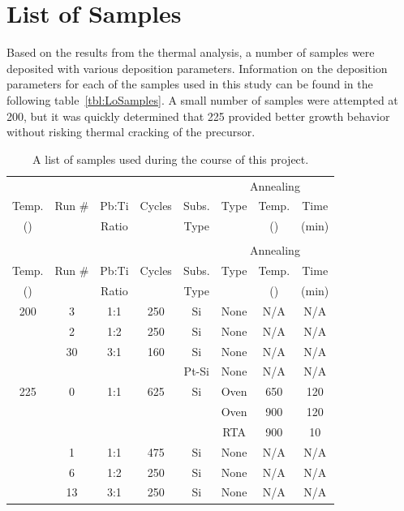 \section{List of Samples}
\label{chap:Results-Samples}

Based on the results from the thermal analysis, a number of samples were deposited with various deposition parameters. Information on the deposition parameters for each of the samples used in this study can be found in the following table~\vref{tbl:LoSamples}. A small number of samples were attempted at 200\degC{}, but it was quickly determined that 225\degC{} provided better growth behavior without risking thermal cracking of the precursor. 

{\small
\vspace{2em}
\begin{longtable}{cccccccc}
	\caption[List of Samples]{A list of samples produced during the course of this project.%
	\label{tbl:LoSamples}}\\
	\toprule
	&&&&&\multicolumn{3}{c}{Annealing}\\ \cmidrule{6-8}
	Temp.		&Run \#	&Pb:Ti	 	&Cycles 	&Subs. 	&Type	&Temp. 		&Time\\ 
	(\degC{})		&		&Ratio		&		&Type	&		&(\degC{})	&(min)\\ \midrule%
	\endfirsthead
	\caption[]{A list of samples used during the course of this project.}\\
	\toprule
	&&&&&\multicolumn{3}{c}{Annealing}\\ \cmidrule{6-8}
	Temp.		&Run \#	&Pb:Ti	 	&Cycles 	&Subs. 	&Type	&Temp. 		&Time \\ 
	(\degC{})		&		&Ratio		&		&Type	&		&(\degC{})	&(min) \\ \midrule%
	\endhead
	200	&3		&1:1		&250	&Si		&None	&N/A		&N/A		\\
		&2		&1:2		&250	&Si		&None	&N/A		&N/A		\\
		&30		&3:1		&160	&Si		&None	&N/A		&N/A		\\
		&		&		&		&Pt-Si	&None	&N/A		&N/A		\\ \midrule
	225	&0		&1:1		&625	&Si		&Oven	&650	&120	\\
		&		&		&		&		&Oven	&900	&120	\\
		&		&		&		&		&RTA	&900	&10		\\
		&1		&1:1		&475	&Si		&None	&N/A		&N/A		\\
		&6		&1:2		&250	&Si		&None 	&N/A		&N/A		\\
		&13		&3:1		&250	&Si		&None 	&N/A		&N/A		\\

\end{longtable}}

